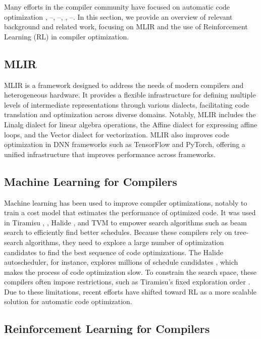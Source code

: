 \documentclass[10pt,twocolumn]{article}
\begin{document}
Many efforts in the compiler community have focused on automatic code optimization \cite{ref1}, \cite{ref3}--\cite{ref5}, \cite{ref9}--\cite{ref11}, \cite{ref13}, \cite{ref17}--\cite{ref45}. In this section, we provide an overview of relevant background and related work, focusing on MLIR and the use of Reinforcement Learning (RL) in compiler optimization.

\subsection{MLIR}

MLIR \cite{ref12} is a framework designed to address the needs of modern compilers and heterogeneous hardware. It provides a flexible infrastructure for defining multiple levels of intermediate representations through various dialects, facilitating code translation and optimization across diverse domains. Notably, MLIR includes the Linalg dialect for linear algebra operations, the Affine dialect for expressing affine loops, and the Vector dialect for vectorization. MLIR also improves code optimization in DNN frameworks such as TensorFlow and PyTorch, offering a unified infrastructure that improves performance across frameworks.

\subsection{Machine Learning for Compilers}

Machine learning has been used to improve compiler optimizations, notably to train a cost model that estimates the performance of optimized code. It was used in Tiramisu \cite{ref5}, \cite{ref38}, Halide \cite{ref3}, and TVM \cite{ref46} to empower search algorithms such as beam search to efficiently find better schedules. Because these compilers rely on tree-search algorithms, they need to explore a large number of optimization candidates to find the best sequence of code optimizations. The Halide autoscheduler, for instance, explores millions of schedule candidates \cite{ref3}, which makes the process of code optimization slow. To constrain the search space, these compilers often impose restrictions, such as Tiramisu's fixed exploration order \cite{ref5}. Due to these limitations, recent efforts have shifted toward RL as a more scalable solution for automatic code optimization.

\subsection{Reinforcement Learning for Compilers}
\end{document}
